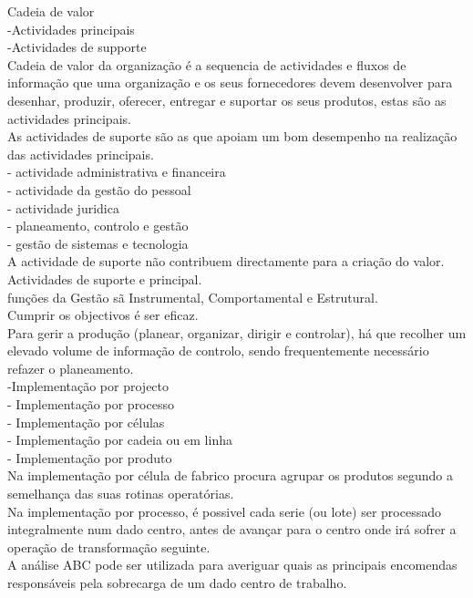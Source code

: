 Cadeia de valor\\
-Actividades principais\\
-Actividades de supporte\\

Cadeia de valor da organização é a sequencia de actividades e fluxos de informação que uma organização e os seus fornecedores devem desenvolver para desenhar, produzir, oferecer, entregar e suportar os seus produtos, estas são as actividades principais.\\

As actividades de suporte são as que apoiam um bom desempenho na realização das actividades principais.\\
- actividade administrativa e financeira\\
- actividade da gestão do pessoal\\
- actividade juridica\\
- planeamento, controlo e gestão\\
- gestão de sistemas e tecnologia\\

A actividade de suporte não contribuem directamente para a criação do valor.\\


Actividades de suporte e principal.\\
funções da Gestão sã Instrumental, Comportamental e Estrutural.\\



Cumprir os objectivos é ser eficaz.\\


Para gerir a produção (planear, organizar, dirigir e controlar), há que recolher um elevado volume de informação de controlo, sendo frequentemente necessário refazer o planeamento.\\

-Implementação por projecto\\
- Implementação por processo\\
- Implementação por células\\
- Implementação por cadeia ou em linha\\
- Implementação por produto\\

Na implementação por célula de fabrico procura agrupar os produtos segundo a semelhança das suas rotinas operatórias.\\
Na implementação por processo, é possivel cada serie (ou lote) ser processado integralmente num dado centro, antes de avançar para o centro onde irá sofrer a operação de transformação seguinte.\\
A análise ABC pode ser utilizada para averiguar quais as principais encomendas responsáveis pela sobrecarga de um dado centro de trabalho.\\

